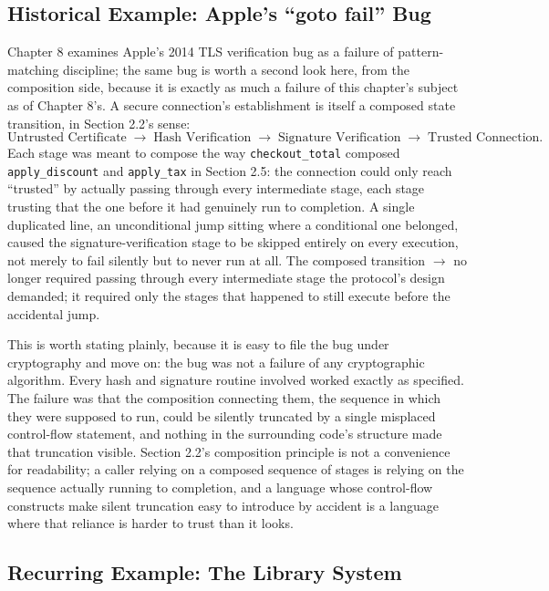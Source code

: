 \documentclass[11pt]{book}
\begin{document}
\subsection*{Historical Example: Apple's ``goto fail'' Bug}

Chapter 8 examines Apple's 2014 TLS verification bug as a failure of pattern-matching discipline; the same bug is worth a second look here, from the composition side, because it is exactly as much a failure of this chapter's subject as of Chapter 8's. A secure connection's establishment is itself a composed state transition, in Section 2.2's sense:
\[
\text{Untrusted Certificate} \;\rightarrow\; \text{Hash Verification} \;\rightarrow\; \text{Signature Verification} \;\rightarrow\; \text{Trusted Connection}.
\]
Each stage was meant to compose the way \texttt{checkout\_total} composed \texttt{apply\_discount} and \texttt{apply\_tax} in Section 2.5: the connection could only reach ``trusted'' by actually passing through every intermediate stage, each stage trusting that the one before it had genuinely run to completion. A single duplicated line, an unconditional jump sitting where a conditional one belonged, caused the signature-verification stage to be skipped entirely on every execution, not merely to fail silently but to never run at all. The composed transition  $\rightarrow$  no longer required passing through every intermediate stage the protocol's design demanded; it required only the stages that happened to still execute before the accidental jump.

This is worth stating plainly, because it is easy to file the bug under cryptography and move on: the bug was not a failure of any cryptographic algorithm. Every hash and signature routine involved worked exactly as specified. The failure was that the composition connecting them, the sequence in which they were supposed to run, could be silently truncated by a single misplaced control-flow statement, and nothing in the surrounding code's structure made that truncation visible. Section 2.2's composition principle is not a convenience for readability; a caller relying on a composed sequence of stages is relying on the sequence actually running to completion, and a language whose control-flow constructs make silent truncation easy to introduce by accident is a language where that reliance is harder to trust than it looks.

\subsection*{Recurring Example: The Library System}
\end{document}
